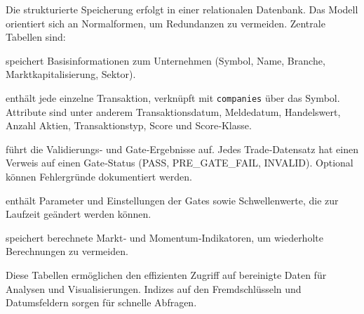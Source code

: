 Die strukturierte Speicherung erfolgt in einer relationalen Datenbank. Das Modell orientiert sich an Normalformen, um Redundanzen zu vermeiden. Zentrale Tabellen sind:

\begin{description}[style=nextline]
  \item[companies] speichert Basisinformationen zum Unternehmen (Symbol, Name, Branche, Marktkapitalisierung, Sektor).
  \item[insider\_trades] enthält jede einzelne Transaktion, verknüpft mit \texttt{companies} über das Symbol. Attribute sind unter anderem Transaktionsdatum, Meldedatum, Handelswert, Anzahl Aktien, Transaktionstyp, Score und Score‑Klasse.
  \item[gate\_status] führt die Validierungs‑ und Gate‑Ergebnisse auf. Jedes Trade‑Datensatz hat einen Verweis auf einen Gate‑Status (PASS, PRE\_GATE\_FAIL, INVALID). Optional können Fehlergründe dokumentiert werden.
  \item[filters] enthält Parameter und Einstellungen der Gates sowie Schwellenwerte, die zur Laufzeit geändert werden können.
  \item[market\_signal\_cache] speichert berechnete Markt‑ und Momentum‑Indikatoren, um wiederholte Berechnungen zu vermeiden.
\end{description}

Diese Tabellen ermöglichen den effizienten Zugriff auf bereinigte Daten für Analysen und Visualisierungen. Indizes auf den Fremdschlüsseln und Datumsfeldern sorgen für schnelle Abfragen.